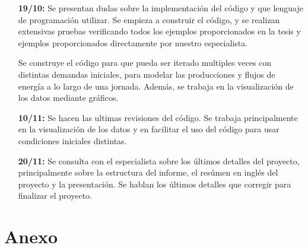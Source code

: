 \documentclass[12pt,twoside]{article}
\begin{document}
\begin{enumerate}
		\item [\textbf{19/10:}] Se presentan dudas sobre la implementaci\'on del c\'odigo y que lenguaje de programaci\'on utilizar. Se empieza a construir el c\'odigo, y se realizan extensivas pruebas verificando todos los ejemplos proporcionados en la tesis y ejemplos proporcionados directamente por nuestro especialista.
		
		Se construye el c\'odigo para que pueda ser iterado multiples veces con distintas demandas iniciales, para modelar las producciones y flujos de energ\'ia a lo largo de una jornada. Adem\'as, se trabaja en la visualizaci\'on de los datos mediante gr\'aficos.
		
		\item[\textbf{10/11:}] Se hacen las ultimas revisiones del c\'odigo. Se trabaja principalmente en la visualizaci\'on de los datos y en facilitar el uso del c\'odigo para usar condiciones iniciales distintas. 
		
		\item[\textbf{20/11:}] Se consulta con el especialista sobre los \'ultimos detalles del proyecto, principalmente sobre la estructura del informe, el res\'umen en ingl\'es del proyecto y la presentaci\'on. Se hablan los \'ultimos detalles que corregir para finalizar el proyecto.
	\end{enumerate}
	
	\newpage
	\section{Anexo}
	
\end{document}
